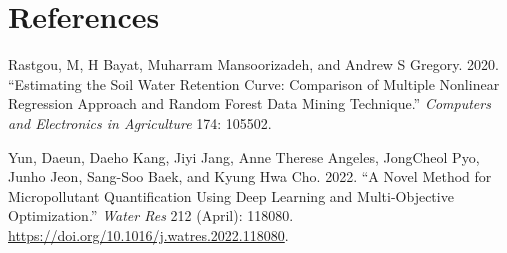 \documentclass[
  11pt,
  oneside]{book}
\newlength{\cslhangindent}
\newlength{\cslentryspacingunit} %
\newenvironment{CSLReferences}[2] %
 {%
  \setlength{\parindent}{0pt}
  \ifodd #1
  \let\oldpar\par
  \def\par{\hangindent=\cslhangindent\oldpar}
  \fi
  \setlength{\parskip}{#2\cslentryspacingunit}
 }%
 {}
\begin{document}
\hypertarget{references}{%
\chapter*{References}\label{references}}

\hypertarget{refs}{}
\begin{CSLReferences}{1}{0}
\leavevmode{}%
Rastgou, M, H Bayat, Muharram Mansoorizadeh, and Andrew S Gregory. 2020. {``Estimating the Soil Water Retention Curve: Comparison of Multiple Nonlinear Regression Approach and Random Forest Data Mining Technique.''} \emph{Computers and Electronics in Agriculture} 174: 105502.

\leavevmode{}%
Yun, Daeun, Daeho Kang, Jiyi Jang, Anne Therese Angeles, JongCheol Pyo, Junho Jeon, Sang-Soo Baek, and Kyung Hwa Cho. 2022. {``A Novel Method for Micropollutant Quantification Using Deep Learning and Multi-Objective Optimization.''} \emph{Water Res} 212 (April): 118080. \url{https://doi.org/10.1016/j.watres.2022.118080}.

\end{CSLReferences}
\end{document}
